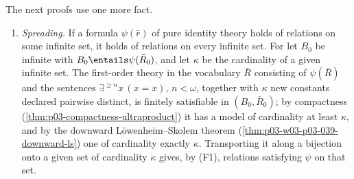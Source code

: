 The next proofs use one more fact.
\begin{enumerate}
  \item[(F3)] \emph{Spreading.} If a formula \(\psi(\bar r)\) of pure identity
        theory holds of relations on some infinite set, it holds of relations
        on every infinite set. For let \(B_0\) be infinite with
        \(B_0\entails\psi(\bar R_0)\), and let \(\kappa\) be the cardinality
        of a given infinite set. The first-order theory in the
        vocabulary \(\bar R\) consisting of \(\psi(\bar R)\) and the sentences
        \(\exists^{\ge n}x\,(x=x)\), \(n<\omega\), together with
        \(\kappa\) new constants declared pairwise distinct, is finitely
        satisfiable in \((B_0,\bar R_0)\); by compactness
        (\cref{thm:p03-compactness-ultraproduct}) it has a model of
        cardinality at least \(\kappa\), and by the downward
        L\"owenheim--Skolem theorem
        (\cref{thm:p03-w03-p03-039-downward-ls}) one of cardinality exactly
        \(\kappa\). Transporting it along a bijection onto a given set of
        cardinality \(\kappa\) gives, by (F1), relations satisfying \(\psi\)
        on that set.
\end{enumerate}

